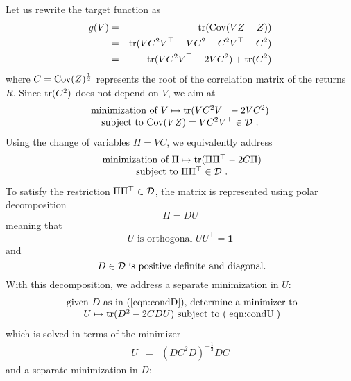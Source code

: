 {Let us rewrite the target function as
\begin{eqnarray*}
g(V)&=&{\rm tr}({\rm Cov}(VZ-Z)) \\&=&
{\rm tr} ( V C^2V^\top - V C^2 - C^2 V^\top +C^2) \\
&=&
{\rm tr} ( V C^2V^\top -2 V C^2 )+ {\rm tr} (C^2)
\end{eqnarray*}
where $C={\rm Cov}(Z)^\frac{1}{2}$ represents the root of the  correlation matrix of the returns $R$. Since
${\rm tr} (C^2)$ does not depend on $V$, we aim at 
$$
 \begin{array}{c}
\text{  minimization of $V \mapsto {\rm tr} ( V C^2V^\top -2 V C^2 )$ }\\
\text{subject to  $ {\rm Cov}(VZ)=VC^2V^\top
	\in {\cal D} $ }.
\end{array}
$$
Using the change of variables $\Pi=VC$, we equivalently address 
\begin{equation*}
\begin{array}{c}
\text{  minimization of $\Pi \mapsto {\rm tr} ( \Pi \Pi^\top -2  C \Pi )$} \\
\text{ subject to 
	$ \Pi \Pi^{\top}
	\in {\cal D} $ }.
\end{array}
\end{equation*}
To satisfy the restriction $\Pi \Pi^{\top}
\in {\cal D}$, the  matrix is represented using polar decomposition
\begin{equation*} 
\Pi=D U 
\end{equation*}
meaning that
\begin{equation}\label{eqn:condU}
\text{ $U$ is orthogonal  $U U^\top=\mathbf{1}$ } 
\end{equation}
and 
\begin{equation}\label{eqn:condD}
\text{	 $D \in {\cal D}$ is positive definite and diagonal.}
\end{equation}
With this decomposition, we address a separate minimization in $U$:
\begin{equation*}
\begin{array}{c}
\text{  given $D$ as in (\ref{eqn:condD}), determine a minimizer to} \\
\text{
$U \mapsto {\rm tr} ( D^2 -2  C D U)$  subject to (\ref{eqn:condU})}
\end{array} 
\end{equation*}
which is solved in terms of the  minimizer  
\begin{eqnarray*}
U&=&(DC^2D)^{-\frac{1}{2}} DC
\end{eqnarray*}
and a separate minimization in $D$:
}
